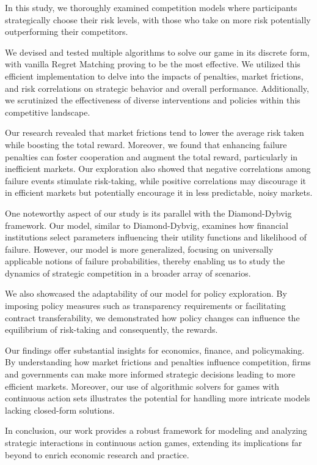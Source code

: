 \documentclass[preprint,12pt,authoryear]{elsarticle}
\theoremstyle{definition}
\begin{document}
In this study, we thoroughly examined competition models where participants strategically choose their risk levels, with those who take on more risk potentially outperforming their competitors. 

We devised and tested multiple algorithms to solve our game in its discrete form, with vanilla Regret Matching proving to be the most effective. We utilized this efficient implementation to delve into the impacts of penalties, market frictions, and risk correlations on strategic behavior and overall performance. Additionally, we scrutinized the effectiveness of diverse interventions and policies within this competitive landscape.

Our research revealed that market frictions tend to lower the average risk taken while boosting the total reward. Moreover, we found that enhancing failure penalties can foster cooperation and augment the total reward, particularly in inefficient markets. Our exploration also showed that negative correlations among failure events stimulate risk-taking, while positive correlations may discourage it in efficient markets but potentially encourage it in less predictable, noisy markets.

One noteworthy aspect of our study is its parallel with the Diamond-Dybvig framework. Our model, similar to Diamond-Dybvig, examines how financial institutions select parameters influencing their utility functions and likelihood of failure. However, our model is more generalized, focusing on universally applicable notions of failure probabilities, thereby enabling us to study the dynamics of strategic competition in a broader array of scenarios.

We also showcased the adaptability of our model for policy exploration. By imposing policy measures such as transparency requirements or facilitating contract transferability, we demonstrated how policy changes can influence the equilibrium of risk-taking and consequently, the rewards.

Our findings offer substantial insights for economics, finance, and policymaking. By understanding how market frictions and penalties influence competition, firms and governments can make more informed strategic decisions leading to more efficient markets. Moreover, our use of algorithmic solvers for games with continuous action sets illustrates the potential for handling more intricate models lacking closed-form solutions. 

In conclusion, our work provides a robust framework for modeling and analyzing strategic interactions in continuous action games, extending its implications far beyond to enrich economic research and practice.
\end{document}
